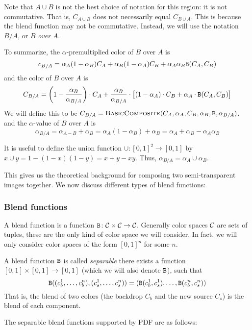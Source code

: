 Note that $A\cup B$ is not the best choice of notation for this region: it is not commutative.
That is, $C_{A\cup B}$ does not necessarily equal $C_{B\cup A}$.
This is because the blend function may not be commutative.
Instead, we will use the notation $B/A$, or $B$ {\it over} $A$.

To summarize, the $\alpha$-premultiplied color of $B$ over $A$ is
$$ c_{B/A} = \alpha_A(1-\alpha_B)C_A + \alpha_B(1-\alpha_A)C_B + \alpha_A\alpha_B{\tt B}(C_A,C_B) $$
and the color of $B$ over $A$ is
$$ C_{B/A} = \left(1-{{\alpha_B}\over{\alpha_{B/A}}}\right)\cdot C_A +
{{\alpha_B}\over{\alpha_{B/A}}}\cdot\bigl[(1-\alpha_A)\cdot C_B+\alpha_A\cdot{\tt B}(C_A,C_B)\bigr] $$
We will define this to be $C_{B/A}=\hbox{\sc BasicComposite}(C_A,\alpha_A,C_B,\alpha_B,{\tt B},\alpha_{B/A})$.
and the $\alpha$-value of $B$ over $A$ is
$$ \alpha_{B/A} = \alpha_{A-B} + \alpha_{B} = \alpha_A(1-\alpha_B) + \alpha_B =
\alpha_A + \alpha_B - \alpha_A\alpha_B $$

It is useful to define the union function ${\cup}\colon[0,1]^2\to[0,1]$ by
$x\cup y=1-(1-x)(1-y)=x+y-xy$.
Thus, $\alpha_{B/A}=\alpha_A\cup\alpha_B$.

This gives us the theoretical background for composing two semi-transparent images together.
We now discuss different types of blend functions:

\subsubsection{Blend functions}

A blend function is a function ${\tt B}\colon{\cal C}\times{\cal C}\to{\cal C}$.
Generally color spaces ${\cal C}$ are sets of tuples, these are the only kind of color space we will consider.
In fact, we will only consider color spaces of the form $[0,1]^n$ for some $n$.

A blend function ${\tt B}$ is called {\it separable} there exists a function $[0,1]\times[0,1]\to[0,1]$ (which we
will also denote ${\tt B}$), such that
$$ {\tt B}((c_b^1,\dots,c_b^n),(c_s^1,\dots,c_s^n))=({\tt B}(c_b^1,c_s^1),\dots,{\tt B}(c_b^n,c_s^n)) $$
That is, the blend of two colors (the backdrop $C_b$ and the new source $C_s$) is the blend of each
component.

The separable blend functions supported by PDF are as follows:


